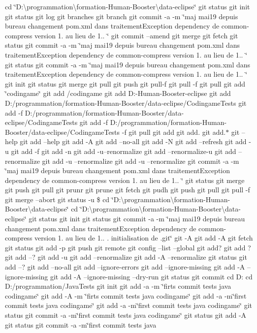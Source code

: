 cd \char`\"{}\+D\+:\textbackslash{}programmation\textbackslash{}formation-\/\+Human-\/\+Booster\textbackslash{}data-\/eclipse\char`\"{} git status git init git status git log git branches git branch git commit -\/a -\/m \char`\"{}maj mai19 depuis bureau changement pom.\+xml dans traitement\+Exception dependency de common-\/compress version 1. au lieu de 1.. \char`\"{} git commit --amend git merge git fetch git status git commit -\/a -\/m \char`\"{}maj mai19 depuis bureau changement pom.\+xml dans traitement\+Exception dependency de common-\/compress version 1. au lieu de 1.. \char`\"{} git status git commit -\/a -\/m \char`\"{}maj mai19 depuis bureau changement pom.\+xml dans traitement\+Exception dependency de common-\/compress version 1. au lieu de 1.. \char`\"{} git init git status git merge git pull git push git pull-\/f git pull -\/f git pull git add \char`\"{}codingame\char`\"{} git add /codingame git add D\+:-\/\+Human-\/\+Booster-\/eclipse git add D\+:/programmation/formation-\/\+Human-\/\+Booster/data-\/eclipse/\+Codingame\+Tests git add -\/f D\+:/programmation/formation-\/\+Human-\/\+Booster/data-\/eclipse/\+Codingame\+Tests git add -\/f D\+:/programmation/formation-\/\+Human-\/\+Booster/data-\/eclipse/\+Codingame\+Tests -\/f git pull git add git add. git add.$\ast$ git --help git add --help git add -\/A git add --no-\/all git add -\/N git add --refresh git add -\/u git add -\/f git add -\/n git add -\/u--renormalize git add --renormalize-\/u git add --renormalize git add -\/u --renormalize git add -\/u --renormalize git commit -\/a -\/m \char`\"{}maj mai19 depuis bureau changement pom.\+xml dans traitement\+Exception dependency de common-\/compress version 1. au lieu de 1.. \char`\"{} git status git merge git push git pull git prunr git prune git fetch git pudh git push git pull git pull -\/f git merge --abort git status -\/u \$ cd \char`\"{}\+D\+:\textbackslash{}programmation\textbackslash{}formation-\/\+Human-\/\+Booster\textbackslash{}data-\/eclipse\char`\"{} cd \char`\"{}\+D\+:\textbackslash{}programmation\textbackslash{}formation-\/\+Human-\/\+Booster\textbackslash{}data-\/eclipse\char`\"{} git status git init git status git commit -\/a -\/m \char`\"{}maj mai19 depuis bureau changement pom.\+xml dans traitement\+Exception dependency de common-\/compress version 1. au lieu de 1.. . initialisation de .\+git\char`\"{} git -\/A git add -\/A git fetch git status git add -\/p git push git remote git config --list --global git add? git add ? git add --? git add -\/u git add --renormalize git add -\/A --renormalize git status git add --? git add --no-\/all git add --ignore-\/errors git add --ignore-\/missing git add -\/A --ignore-\/missing git add -\/A --ignore-\/missing --dry-\/run git status git commit cd D\+: cd D\+:/programmation/\+Java\+Tests git init git add -\/a -\/m \char`\"{}firts commit tests java codingame\char`\"{} git add -\/A -\/m \char`\"{}firts commit tests java codingame\char`\"{} git add -\/a -\/m\char`\"{}first commit tests java codingame\char`\"{} git add -\/a -\/m\char`\"{}first commit tests java codingame\char`\"{} git status git commit -\/a -\/m\char`\"{}first commit tests java codingame\char`\"{} git status git add -\/A git status git commit -\/a -\/m\char`\"{}first commit tests java 